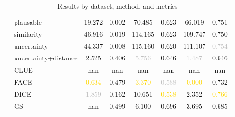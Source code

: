\begin{table}[ht]
\begin{tabular}{l l c c c c c c}
 & plausable & 19.272 & \textcolor{bronze}{0.002} & 70.485 & 0.623 & 66.019 & 0.751 \\
 & similarity & 46.916 & 0.019 & 114.165 & 0.623 & 109.747 & 0.750 \\
 & uncertainty & 44.337 & 0.008 & 115.160 & \textcolor{bronze}{0.620} & 111.107 & \textcolor{silver}{0.754} \\
 & uncertainty+distance & \textcolor{bronze}{2.525} & 0.406 & \textcolor{silver}{5.756} & 0.646 & \textcolor{silver}{1.487} & 0.646 \\
 & CLUE & nan & nan & nan & nan & nan & nan \\
 & FACE & \textcolor{gold}{0.634} & 0.479 & \textcolor{gold}{3.370} & \textcolor{silver}{0.588} & \textcolor{gold}{0.000} & 0.732 \\
 & DICE & \textcolor{silver}{1.859} & 0.162 & 10.651 & \textcolor{gold}{0.538} & \textcolor{bronze}{2.352} & \textcolor{gold}{0.766} \\
 & GS & nan & 0.499 & \textcolor{bronze}{6.100} & 0.696 & 3.695 & 0.685 \\
\hline
\end{tabular}
\caption{Results by dataset, method, and metrics}
\label{tab:results}
\end{table}
